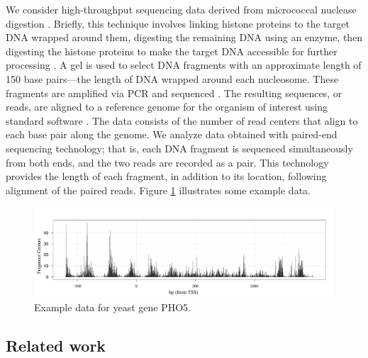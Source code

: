 We consider high-throughput sequencing data derived from micrococcal nuclease digestion %
\citep{Tirosh2012}.
%
Briefly, this technique involves
 linking histone proteins to the target DNA wrapped around them, 
 digesting the remaining DNA using an enzyme,
 then digesting the histone proteins to make the target DNA accessible for further processing \citep[e.g., see][]{Tsankov2010}.
A gel is used to select DNA fragments with an approximate length of 150 base pairs---the length of DNA wrapped around each nucleosome.
These fragments are amplified via PCR and sequenced \citep{Albert2007}.
The resulting sequences, or reads, are aligned to a reference genome for the organism of interest using standard software \citep[Bowtie;][]{lang:trap:pop:salz:2009}.
The data consists of the number of read centers that align to each base pair along the genome.
%
We analyze data obtained with paired-end sequencing technology; that is, each DNA fragment is sequenced simultaneously from both ends, and the two reads are recorded as a pair.
This technology provides the length of each fragment, in addition to its location, following alignment of the paired reads.
Figure \ref{fig:example_data} illustrates some example data.

\ifx\nofigures\undefined
\begin{figure}[b!]
\centering
 \includegraphics[width=\textwidth]{figures/nucleosomes/readsPlot_H_1-PHO5}
 \caption{Example data for yeast gene PHO5.\label{fig:example_data}} 
\end{figure}
\fi

\subsection{Related work}

